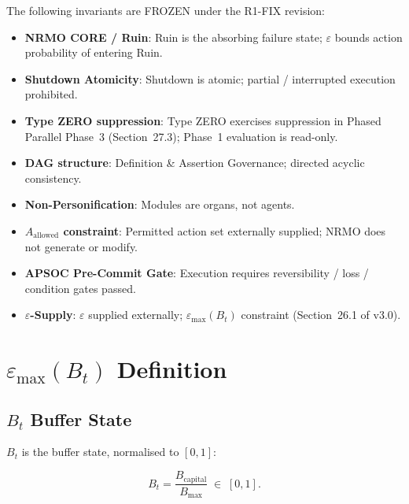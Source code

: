 The following invariants are FROZEN under the R1-FIX revision:

\begin{itemize}
\item \textbf{NRMO CORE / Ruin}: Ruin is the absorbing failure
state; $\varepsilon$ bounds action probability of entering Ruin.
\item \textbf{Shutdown Atomicity}: Shutdown is atomic; partial /
interrupted execution prohibited.
\item \textbf{Type ZERO suppression}: Type ZERO exercises
suppression in Phased Parallel Phase~3 (Section~27.3); Phase~1
evaluation is read-only.
\item \textbf{DAG structure}: Definition \& Assertion Governance;
directed acyclic consistency.
\item \textbf{Non-Personification}: Modules are organs, not agents.
\item \textbf{$A_{\mathrm{allowed}}$ constraint}: Permitted action
set externally supplied; NRMO does not generate or modify.
\item \textbf{APSOC Pre-Commit Gate}: Execution requires
reversibility / loss / condition gates passed.
\item \textbf{$\varepsilon$-Supply}: $\varepsilon$ supplied
externally; $\varepsilon_{\max}(B_t)$ constraint
(Section~26.1 of v3.0).
\end{itemize}

\section{$\varepsilon_{\max}(B_t)$ Definition}
\label{sec:r1fix-epsilon-max}


\subsection{$B_t$ Buffer State}

$B_t$ is the buffer state, normalised to $[0, 1]$:

\begin{equation}
B_t = \frac{B_{\mathrm{capital}}}{B_{\mathrm{max}}}
\;\in\; [0, 1].
\end{equation}

